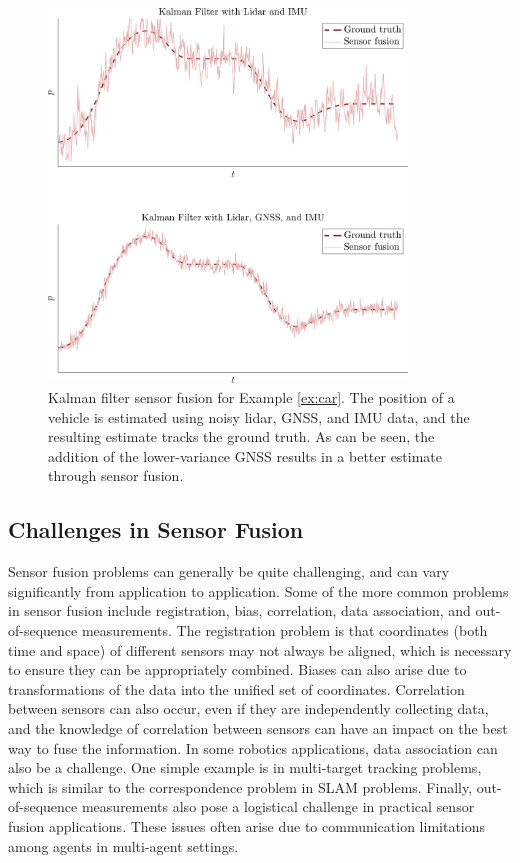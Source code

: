\begin{example}
\begin{figure}[ht!]
    \centering
    \includegraphics[width=0.85\textwidth]{tex/figs/ch18_figs/carKFfusion.png}
    \caption{Kalman filter sensor fusion for Example \ref{ex:car}. The position of a vehicle is estimated using noisy lidar, GNSS, and IMU data, and the resulting estimate tracks the ground truth. As can be seen, the addition of the lower-variance GNSS results in a better estimate through sensor fusion.}
    \label{fig:fusionexample}
\end{figure}
\end{example}


\subsection{Challenges in Sensor Fusion}
Sensor fusion problems can generally be quite challenging, and can vary significantly from application to application. Some of the more common problems in sensor fusion include registration, bias, correlation, data association, and out-of-sequence measurements.
The registration problem is that coordinates (both time and space) of different sensors may not always be aligned, which is necessary to ensure they can be appropriately combined. Biases can also arise due to transformations of the data into the unified set of coordinates. Correlation between sensors can also occur, even if they are independently collecting data, and the knowledge of correlation between sensors can have an impact on the best way to fuse the information. In some robotics applications, data association can also be a challenge. One simple example is in multi-target tracking problems, which is similar to the correspondence problem in SLAM problems. Finally, out-of-sequence measurements also pose a logistical challenge in practical sensor fusion applications. These issues often arise due to communication limitations among agents in multi-agent settings.